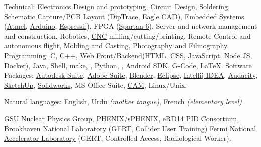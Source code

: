 \documentclass[10pt,letterpaper]{article}
\begin{document}
\inlineheadsection  %
  {Technical:}
  {Electronics Design and prototyping,
   Circuit Design, Soldering,
   Schematic Capture/PCB Layout
    (\href{http://diptrace.com/}{DipTrace},
    \href{http://www.cadsoftusa.com/}{Eagle CAD}),
   Embedded Systems
    (\href{http://www.atmel.com/}{Atmel},
    \href{http://www.arduino.cc/}{Arduino},
    \href{https://espressif.com/}{Espressif}),
   FPGA
    (\href{http://www.xilinx.com/products/silicon-devices/fpga/spartan-6.html}{Spartan-6}),
   Server and network management and construction,
   Robotics,
   \href{http://en.wikipedia.org/wiki/Numerical_control}{CNC} milling/cutting/printing,
   Remote Control and autonomous flight,
   Molding and Casting,
   Photography and Filmography.
  }
  \vspace{0.5em}
  \inlineheadsection
  {Programming:}
  {C,
   C++,
   Web Front/Backend(HTML, CSS, JavaScript, Node JS, \href{https://www.docker.com/}{Docker}),
   Java,
   Shell,
   \href{https://www.gnu.org/software/make/}{make},
   ,
   Python,
   ,
   Android SDK,
   \href{http://en.wikipedia.org/wiki/G-code}{G-Code},
   \href{http://www.latex-project.org}{\LaTeX}.
  }
    \vspace{0.5em}
  \inlineheadsection
  {Software Packages:}
  {\href{http://www.autodesk.com/}{Autodesk Suite},
   \href{http://www.adobe.com/}{Adobe Suite},
   \href{http://www.blender.org/}{Blender},
   \href{https://www.eclipse.org/}{Eclipse},
   \href{http://www.jetbrains.com/idea/}{Intellij IDEA},
   \href{http://audacity.sourceforge.net/}{Audacity},
   \href{http://www.sketchup.com/}{SketchUp},
   \href{http://www.solidworks.com/}{Solidworks},
   MS Office Suite,
   \href{http://en.wikipedia.org/wiki/Computer-aided_manufacturing}{CAM},
   Linux/Unix.}

\vspace{0.5em}
\inlineheadsection
  {Natural languages:}
  {English,
   Urdu \emph{(mother tongue)},
   French \emph{(elementary level)}
  }

\spacedhrule{1.6em}{-0.4em}

  {\href{http://phynp6.phy-astr.gsu.edu/}{GSU Nuclear Physics Group},
  \href{https://www.phenix.bnl.gov/}{PHENIX}/sPHENIX,
  eRD14 PID Consortium,
  \href{https://www.bnl.gov/}{Brookhaven National Laboratory} (GERT, Collider User Training)
  \href{http://www.fnal.gov/}{Fermi National Accelerator Laboratory} (GERT, Controlled Access, Radiological Worker).
  }
\end{document}
